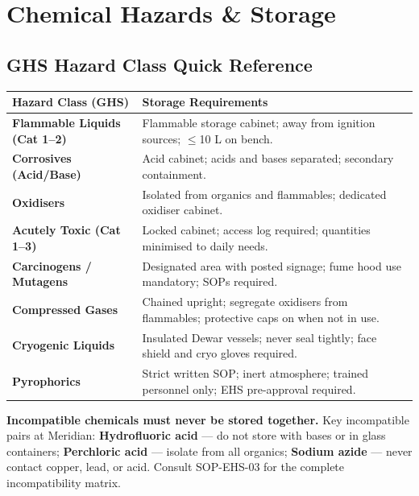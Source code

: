 \section{Chemical Hazards \& Storage}

\subsection{GHS Hazard Class Quick Reference}

\begin{tabularx}{\linewidth}{@{}>{\bfseries}l >{\raggedright\arraybackslash}X@{}}
  \rowcolor{accent}
  \color{white}Hazard Class (GHS) & \color{white}Storage Requirements \\
  \midrule
  Flammable Liquids (Cat 1--2)   & Flammable storage cabinet; away from ignition sources; $\leq$10 L on bench. \\
  Corrosives (Acid/Base)         & Acid cabinet; acids and bases separated; secondary containment. \\
  Oxidisers                      & Isolated from organics and flammables; dedicated oxidiser cabinet. \\
  Acutely Toxic (Cat 1--3)       & Locked cabinet; access log required; quantities minimised to daily needs. \\
  Carcinogens / Mutagens         & Designated area with posted signage; fume hood use mandatory; SOPs required. \\
  Compressed Gases               & Chained upright; segregate oxidisers from flammables; protective caps on when not in use. \\
  Cryogenic Liquids              & Insulated Dewar vessels; never seal tightly; face shield and cryo gloves required. \\
  Pyrophorics                    & Strict written SOP; inert atmosphere; trained personnel only; EHS pre-approval required. \\
\end{tabularx}

\smallskip
\begin{dangerbox}
  \textbf{Incompatible chemicals must never be stored together.} Key incompatible pairs at
  Meridian: \textbf{Hydrofluoric acid} --- do not store with bases or in glass containers;
  \textbf{Perchloric acid} --- isolate from all organics; \textbf{Sodium azide} --- never contact
  copper, lead, or acid. Consult SOP-EHS-03 for the complete incompatibility matrix.
\end{dangerbox}

